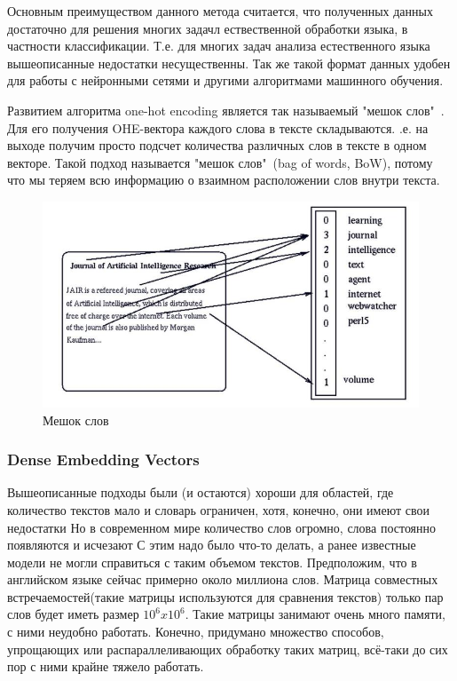 Основным преимуществом данного метода считается, что полученных данных достаточно для решения многих задачл ествественной обработки языка\cite{Book26}, в частности классификации. Т.е. для многих задач анализа естественного языка вышеописанные недостатки несущественны. Так же такой формат данных удобен для работы с нейронными сетями и другими алгоритмами машинного обучения.

Развитием алгоритма one-hot encoding является так называемый "мешок слов"\ . Для его получения OHE-вектора каждого слова в тексте складываются. .е. на выходе получим просто подсчет количества различных слов в тексте в одном векторе. Такой подход называется "мешок слов"\ (bag of words, BoW), потому что мы теряем всю информацию о взаимном расположении слов внутри текста.
\begin{figure}[!h]
	\centering
	\includegraphics[width=.5\textwidth]{master_img/wordbag.jpg}
	\caption{Мешок слов}
	\label{fig03_master}
\end{figure}
\subsubsection{Dense Embedding Vectors}

Вышеописанные подходы были (и остаются) хороши для областей, где количество текстов мало и словарь ограничен, хотя, конечно, они имеют свои недостатки Но в современном мире количество слов огромно, слова постоянно появляются и исчезают С этим надо было что-то делать, а ранее известные модели не могли справиться с таким объемом текстов. Предположим, что в английском языке сейчас примерно около миллиона слов. Матрица совместных встречаемостей(такие матрицы используются для сравнения текстов) только пар слов будет  иметь размер $10^6 x 10^6$. Такие матрицы занимают очень много памяти, с ними неудобно работать. Конечно,  придумано множество способов, упрощающих или распараллеливающих обработку таких матриц, всё-таки до сих пор с ними крайне тяжело работать\cite{Book27}.

